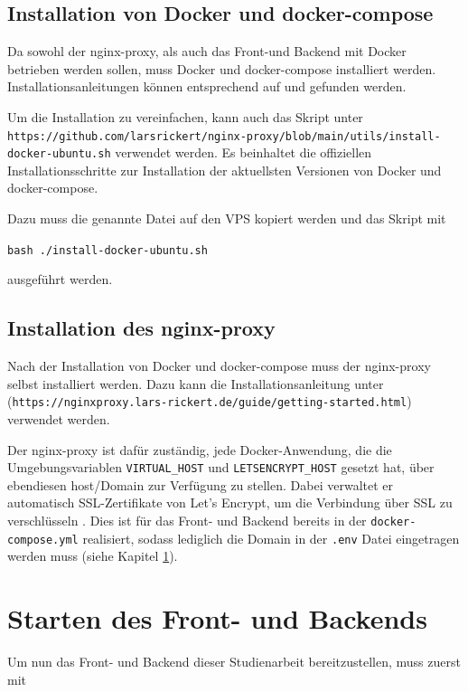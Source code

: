 \subsection{Installation von Docker und docker-compose}
Da sowohl der nginx-proxy, als auch das Front-und Backend mit Docker betrieben werden sollen, muss Docker und docker-compose installiert werden. Installationsanleitungen können entsprechend auf \cite{DockerInstallation} und \cite{DockerDomposeInstallation} gefunden werden.

Um die Installation zu vereinfachen, kann auch das Skript unter \lstinline{https://github.com/larsrickert/nginx-proxy/blob/main/utils/install-docker-ubuntu.sh} verwendet werden. Es beinhaltet die offiziellen Installationsschritte zur Installation der aktuellsten Versionen von Docker und docker-compose.

Dazu muss die genannte Datei auf den \ac{VPS} kopiert werden und das Skript mit

\begin{center}
  \lstinline{bash ./install-docker-ubuntu.sh}
\end{center}

ausgeführt werden.

\subsection{Installation des nginx-proxy}
Nach der Installation von Docker und docker-compose muss der nginx-proxy selbst installiert werden. Dazu kann die Installationsanleitung unter \cite{NginxProxyInstallation} (\lstinline{https://nginxproxy.lars-rickert.de/guide/getting-started.html}) verwendet werden.

Der nginx-proxy ist dafür zuständig, jede Docker-Anwendung, die die Umgebungsvariablen \lstinline{VIRTUAL_HOST} und \lstinline{LETSENCRYPT_HOST} gesetzt hat, über ebendiesen host/Domain zur Verfügung zu stellen. Dabei verwaltet er automatisch SSL-Zertifikate von Let's Encrypt, um die Verbindung über SSL zu verschlüsseln \cite{NginxProxyDeployment}. Dies ist für das Front- und Backend bereits in der \lstinline{docker-compose.yml} realisiert, sodass lediglich die Domain in der \lstinline{.env} Datei eingetragen werden muss (siehe Kapitel \ref{sec:start-applications}).

\section{Starten des Front- und Backends}
\label{sec:start-applications}
Um nun das Front- und Backend dieser Studienarbeit bereitzustellen, muss zuerst mit

